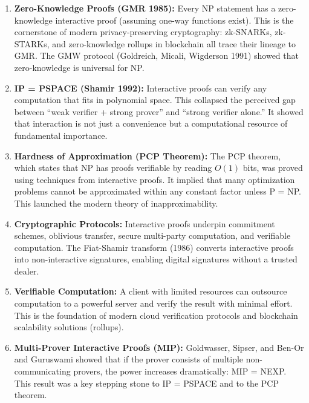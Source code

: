 \begin{enumerate}
\item \textbf{Zero-Knowledge Proofs (GMR 1985):} Every NP statement has a zero-knowledge interactive proof (assuming one-way functions exist). This is the cornerstone of modern privacy-preserving cryptography: zk-SNARKs, zk-STARKs, and zero-knowledge rollups in blockchain all trace their lineage to GMR. The GMW protocol (Goldreich, Micali, Wigderson 1991) showed that zero-knowledge is universal for NP.

\item \textbf{IP = PSPACE (Shamir 1992):} Interactive proofs can verify any computation that fits in polynomial space. This collapsed the perceived gap between ``weak verifier + strong prover'' and ``strong verifier alone.'' It showed that interaction is not just a convenience but a computational resource of fundamental importance.

\item \textbf{Hardness of Approximation (PCP Theorem):} The PCP theorem, which states that NP has proofs verifiable by reading $O(1)$ bits, was proved using techniques from interactive proofs. It implied that many optimization problems cannot be approximated within any constant factor unless P = NP. This launched the modern theory of inapproximability.

\item \textbf{Cryptographic Protocols:} Interactive proofs underpin commitment schemes, oblivious transfer, secure multi-party computation, and verifiable computation. The Fiat-Shamir transform (1986) converts interactive proofs into non-interactive signatures, enabling digital signatures without a trusted dealer.

\item \textbf{Verifiable Computation:} A client with limited resources can outsource computation to a powerful server and verify the result with minimal effort. This is the foundation of modern cloud verification protocols and blockchain scalability solutions (rollups).

\item \textbf{Multi-Prover Interactive Proofs (MIP):} Goldwasser, Sipser, and Ben-Or and Guruswami showed that if the prover consists of multiple non-communicating provers, the power increases dramatically: MIP = NEXP. This result was a key stepping stone to IP = PSPACE and to the PCP theorem.
\end{enumerate}

